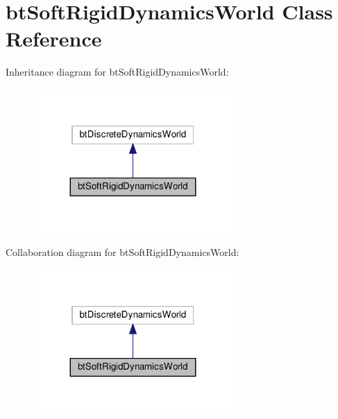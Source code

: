 \hypertarget{classbtSoftRigidDynamicsWorld}{}\section{bt\+Soft\+Rigid\+Dynamics\+World Class Reference}
\label{classbtSoftRigidDynamicsWorld}


Inheritance diagram for bt\+Soft\+Rigid\+Dynamics\+World\+:
\nopagebreak
\begin{figure}[H]
\begin{center}
\leavevmode
\includegraphics[width=215pt]{classbtSoftRigidDynamicsWorld__inherit__graph}
\end{center}
\end{figure}


Collaboration diagram for bt\+Soft\+Rigid\+Dynamics\+World\+:
\nopagebreak
\begin{figure}[H]
\begin{center}
\leavevmode
\includegraphics[width=215pt]{classbtSoftRigidDynamicsWorld__coll__graph}
\end{center}
\end{figure}
